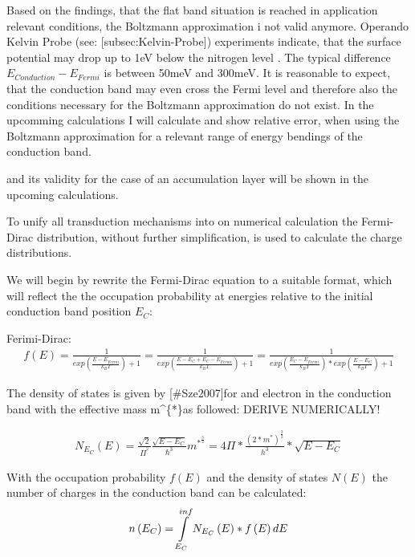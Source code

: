 \documentclass[11pt]{article}
\begin{document}
Based on the findings, that the flat band situation is reached in
application relevant conditions, the Boltzmann approximation i not valid
anymore. Operando Kelvin Probe (see: {[}subsec:Kelvin-Probe{]})
experiments indicate, that the surface potential may drop up to 1eV
below the nitrogen level \cite{Barsan2015}. The typical difference
\(E_{Conduction}-E_{Fermi}\) is between 50meV and 300meV. It is
reasonable to expect, that the conduction band may even cross the Fermi
level and therefore also the conditions necessary for the Boltzmann
approximation do not exist. In the upcomming calculations I will
calculate and show relative error, when using the Boltzmann
approximation for a relevant range of energy bendings of the conduction
band.

\cite{Barsan2011a} and its validity for the case of an accumulation
layer will be shown in the upcoming calculations.

To unify all transduction mechanisms into on numerical calculation the
Fermi-Dirac distribution, without further simplification, is used to
calculate the charge distributions.

We will begin by rewrite the Fermi-Dirac equation to a suitable format,
which will reflect the the occupation probability at energies relative
to the initial conduction band position \(E_C\):

Ferimi-Dirac: \begin{align}
f(E)=\frac{1}{exp(\frac{E-E_{Fermi}}{k_{B}T})+1}=\frac{1}{exp(\frac{E-E_{C}+E_{C}-E_{Fermi}}{k_{B}T})+1}=\frac{1}{exp(\frac{E_{C}-E_{Fermi}}{k_{B}T})*exp(\frac{E-E_{C}}{k_{B}T})+1}
\end{align}

The density of states is given by {[}\#Sze2007{]}for and electron in the
conduction band with the effective mass m\^{}\{*\}as followed: DERIVE
NUMERICALLY!

\begin{align}
N_{E_{C}}\left(E\right)=\frac{\sqrt{2}}{\Pi^{^{2}}}\frac{\sqrt{E-E_{C}}}{\hbar^{3}}m^{*^{\frac{3}{2}}}=4\Pi*\frac{\left(2*m^{*}\right)^{\frac{3}{2}}}{h^{3}}*\sqrt{E-E_{C}}
\end{align}

With the occupation probability \(f(E)\) and the density of states
\(N(E)\) the number of charges in the conduction band can be calculated:
\begin{align}
n\left(E_{C}\right)=\intop_{E_{C}}^{inf}N_{E_{C}}\left(E\right)*f\left(E\right)dE
\end{align}
\end{document}
